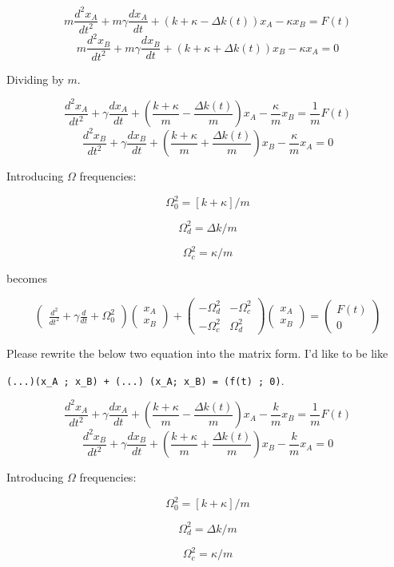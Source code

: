 \[
  m \frac{d^2x_A}{dt^2} + m \gamma \frac{dx_A}{dt} + \left(k + \kappa - \Delta
k(t)\right)x_A
  - \kappa x_B = F(t)
\]
\[
  m \frac{d^2x_B}{dt^2} + m \gamma \frac{dx_B}{dt} + \left(k + \kappa + \Delta
k(t)\right)x_B
  - \kappa x_A = 0
\]

Dividing by $m$.

\[
  \frac{d^2x_A}{dt^2} + \gamma \frac{dx_A}{dt} + \left(\frac{k + \kappa}{m} - \frac{\Delta
    k(t)}{m}\right)x_A -\frac{\kappa}{m}x_B = \frac{1}{m}F(t)
\]
\[
  \frac{d^2x_B}{dt^2} + \gamma \frac{dx_B}{dt} + \left(\frac{k + \kappa}{m} + \frac{\Delta
    k(t)}{m}\right)x_B -\frac{\kappa}{m}x_A = 0
\]

Introducing $\Omega$ frequencies:

\[
  \Omega_0^2 = [k + \kappa]/m
\]

\[
  \Omega_d^2 = \Delta k / m
\]

\[
  \Omega_c^2 = \kappa / m
\]

becomes

\[
\begin{pmatrix}
  \frac{d^2}{dt^2} + \gamma \frac{d}{dt} + \Omega_0^2
\end{pmatrix}
\begin{pmatrix}
 x_A \\
 x_B
\end{pmatrix}
+
\begin{pmatrix}
  -\Omega_d^2 & -\Omega_c^2 \\ -\Omega_c^2 & \Omega_d^2
\end{pmatrix}
\begin{pmatrix}
 x_A \\
 x_B
\end{pmatrix}
=
\begin{pmatrix}
 F(t) \\
 0
\end{pmatrix}
\]


\begin{ai}
Please rewrite the below two equation into the matrix form. I'd like to be like

\vsp

\verb|(...)(x_A ; x_B) + (...) (x_A; x_B) = (f(t) ; 0)|.

\[
  \frac{d^2x_A}{dt^2} + \gamma \frac{dx_A}{dt} + \left(\frac{k + \kappa}{m} - \frac{\Delta
    k(t)}{m}\right)x_A -\frac{k}{m}x_B = \frac{1}{m}F(t)
\]
\[
  \frac{d^2x_B}{dt^2} + \gamma \frac{dx_B}{dt} + \left(\frac{k + \kappa}{m} + \frac{\Delta
    k(t)}{m}\right)x_B -\frac{k}{m}x_A = 0
\]

Introducing $\Omega$ frequencies:

\[
  \Omega_0^2 = [k + \kappa]/m
\]

\[
  \Omega_d^2 = \Delta k / m
\]

\[
  \Omega_c^2 = \kappa / m
\]


\end{ai}

